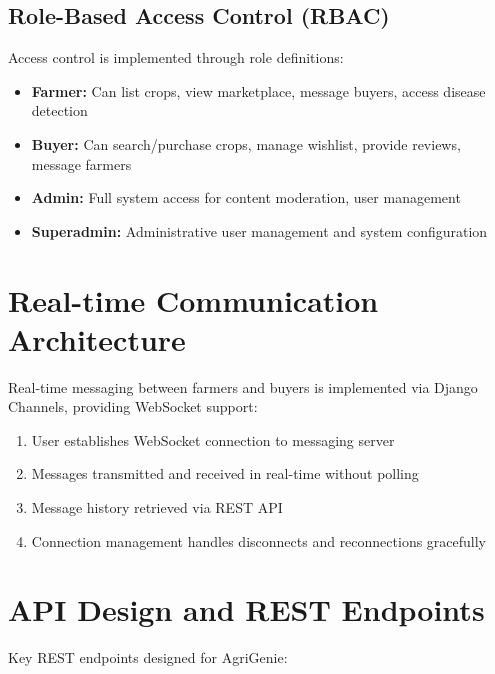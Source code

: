 \documentclass[12pt,a4paper]{report}
\begin{document}
\subsection{Role-Based Access Control (RBAC)}

Access control is implemented through role definitions:

\begin{itemize}
    \item \textbf{Farmer:} Can list crops, view marketplace, message buyers, access disease detection
    \item \textbf{Buyer:} Can search/purchase crops, manage wishlist, provide reviews, message farmers
    \item \textbf{Admin:} Full system access for content moderation, user management
    \item \textbf{Superadmin:} Administrative user management and system configuration
\end{itemize}

\section{Real-time Communication Architecture}

Real-time messaging between farmers and buyers is implemented via Django Channels, providing WebSocket support:

\begin{enumerate}
    \item User establishes WebSocket connection to messaging server
    \item Messages transmitted and received in real-time without polling
    \item Message history retrieved via REST API
    \item Connection management handles disconnects and reconnections gracefully
\end{enumerate}

\section{API Design and REST Endpoints}

Key REST endpoints designed for AgriGenie:
\end{document}
